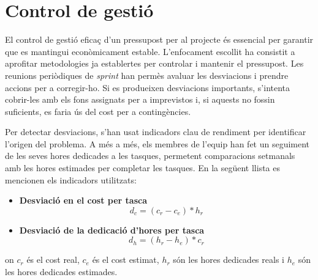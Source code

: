 \section{Control de gestió}
El control de gestió eficaç d'un pressupost per al projecte és essencial per garantir que es mantingui econòmicament estable. L'enfocament escollit ha consistit a aprofitar metodologies ja establertes per controlar i mantenir el pressupost. Les reunions periòdiques de \textit{sprint} han permès avaluar les desviacions i prendre accions per a corregir-ho. Si es produeixen desviacions importants, s'intenta cobrir-les amb els fons assignats per a imprevistos i, si aquests no fossin suficients, es faria ús del cost per a contingències.

Per detectar desviacions, s'han usat indicadors clau de rendiment per identificar l'origen del problema. A més a més, els membres de l'equip han fet un seguiment de les seves hores dedicades a les tasques, permetent comparacions setmanals amb les hores estimades per completar les tasques. En la següent llista es mencionen els indicadors utilitzats:

\begin{itemize}
    \item \textbf{Desviació en el cost per tasca}
    \[d_c = (c_r - c_e) * h_r\]
    \item \textbf{Desviació de la dedicació d'hores per tasca}
    \[d_h = (h_r - h_e) * c_r\]
\end{itemize}

on $c_r$ és el cost real, $c_e$ és el cost estimat, $h_r$ són les hores dedicades reals i $h_e$ són les hores dedicades estimades.